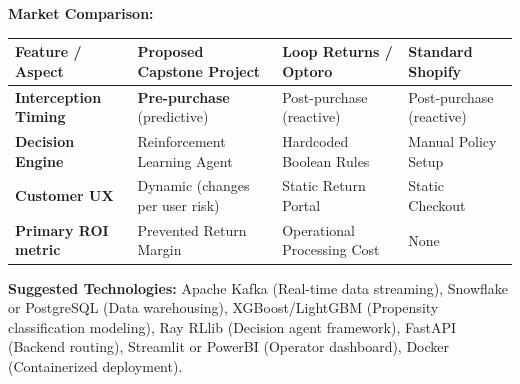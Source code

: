\documentclass[11pt, a4paper]{article}
\begin{document}
\vspace{0.4cm}
\noindent\textbf{Market Comparison:}

\vspace{0.2cm}
\noindent\renewcommand{\arraystretch}{1.5}
\begin{tabular}{|p{3.5cm}|p{4.5cm}|p{3.8cm}|p{3.8cm}|}
\hline
\textbf{Feature / Aspect} & \textbf{Proposed Capstone Project} & \textbf{Loop Returns / Optoro} & \textbf{Standard Shopify} \\
\hline
\textbf{Interception Timing} & \textbf{Pre-purchase} (predictive) & Post-purchase (reactive) & Post-purchase (reactive) \\
\hline
\textbf{Decision Engine} & Reinforcement Learning Agent & Hardcoded Boolean Rules & Manual Policy Setup \\
\hline
\textbf{Customer UX} & Dynamic (changes per user risk) & Static Return Portal & Static Checkout \\
\hline
\textbf{Primary ROI metric} & Prevented Return Margin & Operational Processing Cost & None \\
\hline
\end{tabular}

\vspace{0.4cm}
\noindent\textbf{Suggested Technologies:} Apache Kafka (Real-time data streaming), Snowflake or PostgreSQL (Data warehousing), XGBoost/LightGBM (Propensity classification modeling), Ray RLlib (Decision agent framework), FastAPI (Backend routing), Streamlit or PowerBI (Operator dashboard), Docker (Containerized deployment).
\end{document}
